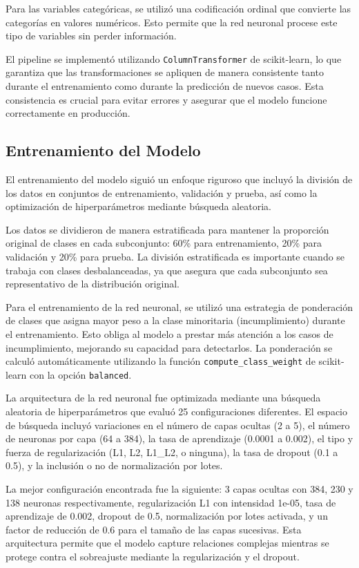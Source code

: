 \documentclass[12pt,a4paper]{article}
\begin{document}
Para las variables categóricas, se utilizó una codificación ordinal que convierte las categorías en valores numéricos. Esto permite que la red neuronal procese este tipo de variables sin perder información.

El pipeline se implementó utilizando \texttt{ColumnTransformer} de scikit-learn, lo que garantiza que las transformaciones se apliquen de manera consistente tanto durante el entrenamiento como durante la predicción de nuevos casos. Esta consistencia es crucial para evitar errores y asegurar que el modelo funcione correctamente en producción.

\subsection{Entrenamiento del Modelo}

El entrenamiento del modelo siguió un enfoque riguroso que incluyó la división de los datos en conjuntos de entrenamiento, validación y prueba, así como la optimización de hiperparámetros mediante búsqueda aleatoria.

Los datos se dividieron de manera estratificada para mantener la proporción original de clases en cada subconjunto: 60\% para entrenamiento, 20\% para validación y 20\% para prueba. La división estratificada es importante cuando se trabaja con clases desbalanceadas, ya que asegura que cada subconjunto sea representativo de la distribución original.

Para el entrenamiento de la red neuronal, se utilizó una estrategia de ponderación de clases que asigna mayor peso a la clase minoritaria (incumplimiento) durante el entrenamiento. Esto obliga al modelo a prestar más atención a los casos de incumplimiento, mejorando su capacidad para detectarlos. La ponderación se calculó automáticamente utilizando la función \texttt{compute\_class\_weight} de scikit-learn con la opción \texttt{balanced}.

La arquitectura de la red neuronal fue optimizada mediante una búsqueda aleatoria de hiperparámetros que evaluó 25 configuraciones diferentes. El espacio de búsqueda incluyó variaciones en el número de capas ocultas (2 a 5), el número de neuronas por capa (64 a 384), la tasa de aprendizaje (0.0001 a 0.002), el tipo y fuerza de regularización (L1, L2, L1\_L2, o ninguna), la tasa de dropout (0.1 a 0.5), y la inclusión o no de normalización por lotes.

La mejor configuración encontrada fue la siguiente: 3 capas ocultas con 384, 230 y 138 neuronas respectivamente, regularización L1 con intensidad 1e-05, tasa de aprendizaje de 0.002, dropout de 0.5, normalización por lotes activada, y un factor de reducción de 0.6 para el tamaño de las capas sucesivas. Esta arquitectura permite que el modelo capture relaciones complejas mientras se protege contra el sobreajuste mediante la regularización y el dropout.
\end{document}
